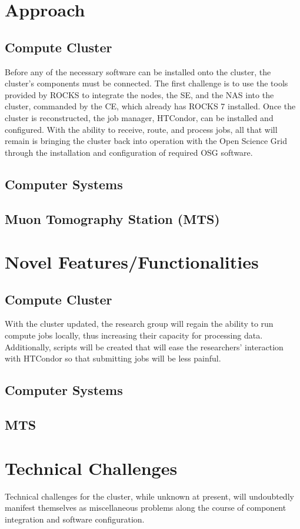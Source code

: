 \documentclass[12pt]{article}
\begin{document}
\section{Approach}
\subsection{Compute Cluster}
Before any of the necessary software can be installed onto the cluster, the
cluster's components must be connected. The first challenge is to use the tools
provided by ROCKS to integrate the nodes, the SE, and the NAS into the cluster,
commanded by the CE, which already has ROCKS 7 installed. Once the cluster is
reconstructed, the job manager, HTCondor, can be installed and configured. With
the ability to receive, route, and process jobs, all that will remain is
bringing the cluster back into operation with the Open Science Grid through the
installation and configuration of required OSG software.
\subsection{Computer Systems}
\subsection{Muon Tomography Station (MTS)}

\section{Novel Features/Functionalities}
\subsection{Compute Cluster}
With the cluster updated, the research group will regain the ability to run
compute jobs locally, thus increasing their capacity for processing
data. Additionally, scripts will be created that will ease the researchers'
interaction with HTCondor so that submitting jobs will be less painful.
\subsection{Computer Systems}
\subsection{MTS}

\section{Technical Challenges}
Technical challenges for the cluster, while unknown at present, will
undoubtedly manifest themselves as miscellaneous problems along the course of
component integration and software configuration. 
\end{document}
